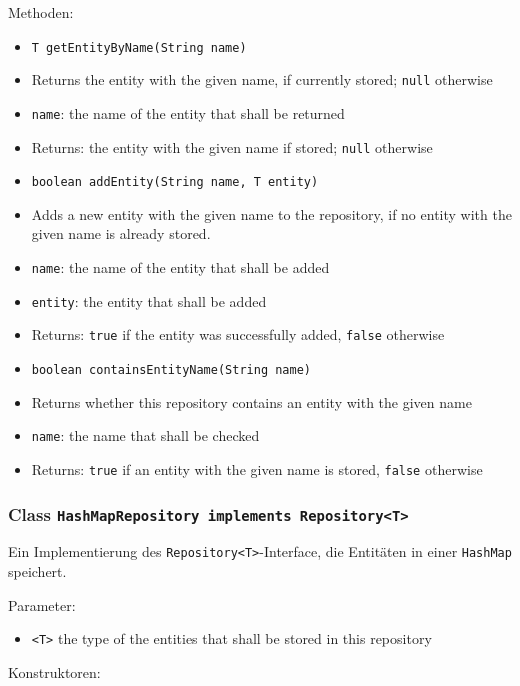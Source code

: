 \documentclass[parskip=full,11pt]{scrartcl}
\begin{document}
Methoden:
\begin{itemize}\itemsep -10pt
	\item \texttt{T getEntityByName(String name)}
	\item[] Returns the entity with the given name, if currently stored; \texttt{null} otherwise
	\item[] \texttt{name}: the name of the entity that shall be returned
	\item[] Returns: the entity with the given name if stored; \texttt{null} otherwise
	
	\item \texttt{boolean addEntity(String name, T entity)}
	\item[] Adds a new entity with the given name to the repository, if no entity with the given name is already stored.
	\item[] \texttt{name}: the name of the entity that shall be added
	\item[] \texttt{entity}: the entity that shall be added
	\item[] Returns: \texttt{true} if the entity was successfully added, \texttt{false} otherwise
	
	\item \texttt{boolean containsEntityName(String name)}
	\item[] Returns whether this repository contains an entity with the given name
	\item[] \texttt{name}: the name that shall be checked
	\item[] Returns: \texttt{true} if an entity with the given name is stored, \texttt{false} otherwise
	
\end{itemize}

\subsubsection{Class \texttt{HashMapRepository implements Repository<T>}}

Ein Implementierung des \texttt{Repository<T>}-Interface, die Entitäten in einer \texttt{HashMap} speichert.

Parameter:

\begin{itemize}\itemsep -10pt
	\item \texttt{<T>} the type of the entities that shall be stored in this repository
\end{itemize}

Konstruktoren:
\end{document}

